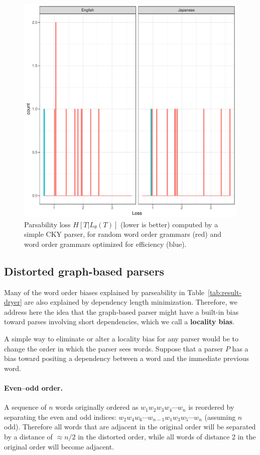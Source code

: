 \documentclass[12pt]{article}
\newcommand{\key}[1]{\textbf{#1}}
\begin{document}
\begin{figure}
    \centering
    \includegraphics[scale=.7]{../results/cky/cky-parse.pdf} 
	\caption{Parsability loss $H[T|L_\theta(T)]$ (lower is better) computed by a simple CKY parser, for random word order grammars (red) and word order grammars optimized for efficiency (blue).}
    \label{fig:cky-parser}
\end{figure}



\subsection{Distorted graph-based parsers}

Many of the word order biases explained by parseability in Table~\ref{tab:result-dryer} are also explained by dependency length minimization. Therefore, we address here the idea that the graph-based parser might have a built-in bias toward parses involving short dependencies, which we call a \key{locality bias}.

A simple way to eliminate or alter a locality bias for any parser would be to change the order in which the parser sees words. Suppose that a parser $P$ has a bias toward positing a dependency between a word and the immediate previous word. 

\paragraph{Even--odd order.} A sequence of $n$ words originally ordered as $w_1 w_2 w_3 w_4 \cdots w_n$ is reordered by separating the even and odd indices: $w_2 w_4 w_6 \cdots w_{n-1} w_1 w_3 w_5 \cdots w_n$ (assuming $n$ odd). Therefore all words that are adjacent in the original order will be separated by a distance of $\approx n/2$ in the distorted order, while all words of distance 2 in the original order will become adjacent.
\end{document}
